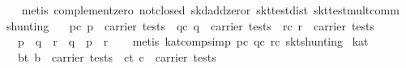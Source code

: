 \begin{isabellebody}
%
\isadelimproof
\ \ %
\endisadelimproof
%
\isatagproof
{}\isamarkupfalse%
\ {}metis\ complement{}zero\ not{}closed\ skd{}add{}zeror\ skt{}test{}dist{}\ skt{}test{}mult{}comm{}%
\endisatagproof
{\isafoldproof}%
%
\isadelimproof
\isanewline
%
\endisadelimproof
\isanewline
{}\isamarkupfalse%
\ shunting{}\isanewline
\ \ \ pc{}\ {}p\ {}\ carrier\ tests{}\ \ qc{}\ {}q\ {}\ carrier\ tests{}\ \ rc{}\ {}r\ {}\ carrier\ tests{}\isanewline
\ \ \ {}p\ {}\ q\ {}\ r\ {}\ q\ {}\ {}p\ {}\ r{}\isanewline
%
\isadelimproof
\ \ %
\endisadelimproof
%
\isatagproof
{}\isamarkupfalse%
\ {}metis\ kat{}comp{}simp\ pc\ qc\ rc\ skt{}shunting{}%
\endisatagproof
{\isafoldproof}%
%
\isadelimproof
\isanewline
%
\endisadelimproof
\isanewline
{}\isamarkupfalse%
\ kat{}{}\isanewline
\ \ \ bt{}\ {}b\ {}\ carrier\ tests{}\ \ ct{}\ {}c\ {}\ carrier\ tests{}\isanewline

\end{isabellebody}
